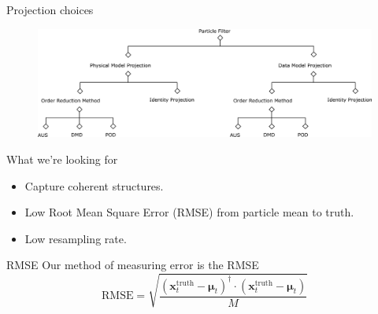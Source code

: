 \documentclass[aspectratio=169]{beamer}
\newcommand{\state}{\boldsymbol{x}}
\begin{document}
\begin{frame}{Projection choices}
\vfill
    \begin{figure}[H]
        \centering
        \includegraphics[width=\textwidth]{figures/decision_tree.png}
    \end{figure}
\vfill
\end{frame}


\begin{frame}{What we're looking for}
\vfill
    \begin{itemize}
    \pause
        \item Capture coherent structures.
    \pause
        \item Low Root Mean Square Error (RMSE) from particle mean to truth.
    \pause
        \item Low resampling rate.
    \end{itemize}
\vfill
\end{frame}


\begin{frame}{RMSE}
\vfill
Our method of measuring error is the RMSE
\[
\textrm{RMSE} = \sqrt{\frac{(\state_t^{\textrm{truth}}-\boldsymbol{\mu}_t)^\dagger \cdot (\state_t^{\textrm{truth}}-\boldsymbol{\mu}_t)}{M}}
\]
\vfill
\end{frame}

\end{document}
